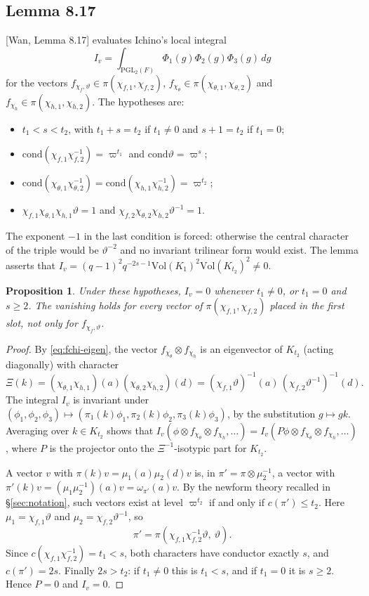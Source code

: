 \documentclass[11pt]{amsart}
\newtheorem{proposition}[theorem]{Proposition}
\theoremstyle{definition}
\theoremstyle{remark}
\newcommand{\PGL}{\mathrm{PGL}}
\newcommand{\cond}{\mathrm{cond}}
\newcommand{\Vol}{\mathrm{Vol}}
\newcommand{\vp}{\varpi}
\begin{document}
\subsection{Lemma 8.17}
[Wan, Lemma 8.17] evaluates Ichino's local integral
\[ I_v=\int_{\PGL_2(F)}\Phi_{1}(g)\Phi_{2}(g)\Phi_{3}(g)\,dg \]
for the vectors $f_{\chi_f,\vartheta}\in\pi(\chi_{f,1},\chi_{f,2})$, $f_{\chi_\theta}\in\pi(\chi_{\theta,1},\chi_{\theta,2})$ and $f_{\chi_h}\in\pi(\chi_{h,1},\chi_{h,2})$. The hypotheses are:
\begin{itemize}
\item $t_1<s<t_2$, with $t_1+s=t_2$ if $t_1\neq0$ and $s+1=t_2$ if $t_1=0$;
\item $\cond(\chi_{f,1}\chi_{f,2}^{-1})=\vp^{t_1}$ and $\cond\vartheta=\vp^s$;
\item $\cond(\chi_{\theta,1}\chi_{\theta,2}^{-1})=\cond(\chi_{h,1}\chi_{h,2}^{-1})=\vp^{t_2}$;
\item $\chi_{f,1}\chi_{\theta,1}\chi_{h,1}\vartheta=1$ and $\chi_{f,2}\chi_{\theta,2}\chi_{h,2}\vartheta^{-1}=1$.
\end{itemize}
The exponent $-1$ in the last condition is forced: otherwise the central character of the triple would be $\vartheta^{-2}$ and no invariant trilinear form would exist. The lemma asserts that $I_v=(q-1)^2q^{-2s-1}\Vol(K_1)^2\Vol(K_{t_2})^2\neq0$.

\begin{proposition}\label{prop:V}
Under these hypotheses, $I_v=0$ whenever $t_1\neq0$, or $t_1=0$ and $s\ge2$. The vanishing holds for \emph{every} vector of $\pi(\chi_{f,1},\chi_{f,2})$ placed in the first slot, not only for $f_{\chi_f,\vartheta}$.
\end{proposition}

\begin{proof}
By \eqref{eq:fchi-eigen}, the vector $f_{\chi_\theta}\otimes f_{\chi_h}$ is an eigenvector of $K_{t_2}$ (acting diagonally) with character
\[\Xi(k)=(\chi_{\theta,1}\chi_{h,1})(a)(\chi_{\theta,2}\chi_{h,2})(d)=(\chi_{f,1}\vartheta)^{-1}(a)\,(\chi_{f,2}\vartheta^{-1})^{-1}(d).\]
The integral $I_v$ is invariant under $(\phi_1,\phi_2,\phi_3)\mapsto(\pi_1(k)\phi_1,\pi_2(k)\phi_2,\pi_3(k)\phi_3)$, by the substitution $g\mapsto gk$. Averaging over $k\in K_{t_2}$ shows that $I_v(\phi\otimes f_{\chi_\theta}\otimes f_{\chi_h},\dots)=I_v(P\phi\otimes f_{\chi_\theta}\otimes f_{\chi_h},\dots)$, where $P$ is the projector onto the $\Xi^{-1}$-isotypic part for $K_{t_2}$.

A vector $v$ with $\pi(k)v=\mu_1(a)\mu_2(d)v$ is, in $\pi'=\pi\otimes\mu_2^{-1}$, a vector with
$\pi'(k)v=(\mu_1\mu_2^{-1})(a)v=\omega_{\pi'}(a)v$. By the newform theory recalled in \S\ref{sec:notation}, such vectors exist at level $\vp^{t_2}$ if and only if $c(\pi')\le t_2$. Here $\mu_1=\chi_{f,1}\vartheta$ and $\mu_2=\chi_{f,2}\vartheta^{-1}$, so
\[ \pi'=\pi(\chi_{f,1}\chi_{f,2}^{-1}\vartheta,\ \vartheta). \]
Since $c(\chi_{f,1}\chi_{f,2}^{-1})=t_1<s$, both characters have conductor exactly $s$, and $c(\pi')=2s$. Finally $2s>t_2$: if $t_1\neq0$ this is $t_1<s$, and if $t_1=0$ it is $s\ge2$. Hence $P=0$ and $I_v=0$.
\end{proof}
\end{document}
